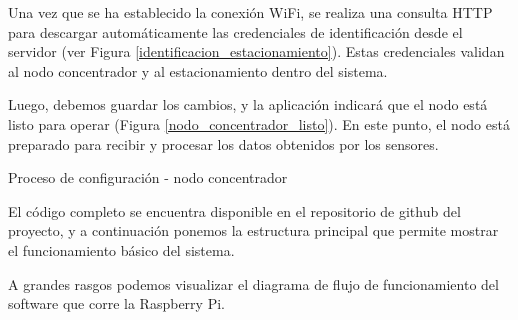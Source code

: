 Una vez que se ha establecido la conexión WiFi, se realiza una consulta HTTP para descargar automáticamente las credenciales de identificación desde el servidor (ver Figura \ref{identificacion_estacionamiento}). Estas credenciales validan al nodo concentrador y al estacionamiento dentro del sistema.


Luego, debemos guardar los cambios, y la aplicación indicará que el nodo está listo para operar (Figura \ref{nodo_concentrador_listo}). En este punto, el nodo está preparado para recibir y procesar los datos obtenidos por los sensores.


\begin{images}[\label{nodo_concentrador_listo}]{Proceso de configuración - nodo concentrador}
\end{images}

El código completo se encuentra disponible en el repositorio de github del proyecto, y a continuación ponemos la estructura principal que permite mostrar el funcionamiento básico del sistema.

A grandes rasgos podemos visualizar el diagrama de flujo de funcionamiento del software que corre la Raspberry Pi.

